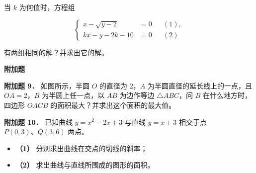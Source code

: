 \begin{question}
当 $k$ 为何值时，方程组

\nopagebreak[4]
\[
\left\{
\begin{aligned}
x-\sqrt{y-2}&=0 &&(1),\\
kx-y-2k-10&=0 &&(2)
\end{aligned}
\right.
\]

有两组相同的解？并求出它的解。

\begin{gktip}
\Needspace{0.25\textheight}
\textbf{附加题}
\end{gktip}

\textbf{附加题 9．} 如图所示，半圆 $O$ 的直径为 $2$，$A$ 为半圆直径的延长线上的一点，且 $OA=2$，$B$ 为半圆上任一点，以 $AB$ 为边作等边 $\triangle ABC$，问 $B$ 在什么地方时，四边形 $OACB$ 的面积最大？并求出这个面积的最大值。
\nopagebreak[4]
\begin{center}\end{center}
\nopagebreak[4]
\textbf{附加题 10．} 已知曲线 $y=x^2-2x+3$ 与直线 $y=x+3$ 相交于点 $P(0,3)\text{、}Q(3,6)$ 两点。

\begin{itemize}
\item \textbf{（1）} 分别求出曲线在交点的切线的斜率；
\end{itemize}

\begin{itemize}
\item \textbf{（2）} 求出曲线与直线所围成的图形的面积。
\end{itemize}

\end{question}